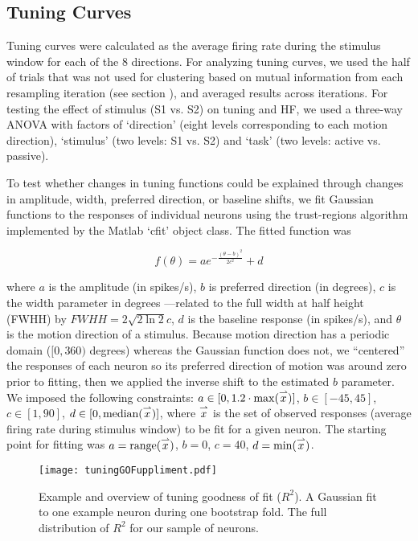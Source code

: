 \subsection*{Tuning Curves}\label{sec:tuning}
Tuning curves were calculated as the average firing rate during the stimulus window for each of the 8 directions. 
For analyzing tuning curves, we used the half of trials that was not used for clustering based on mutual information from each resampling iteration (see section \emph{}), and averaged results across iterations.\label{rev:xval2}
For testing the effect of stimulus (S1 vs. S2) on tuning and HF, we used a three-way ANOVA with factors of `direction' (eight levels corresponding to each motion direction), `stimulus' (two levels: S1 vs. S2) and `task' (two levels: active vs. passive).

To test whether changes in tuning functions could be explained through changes in amplitude, width, preferred direction, or baseline shifts, we fit Gaussian functions to the responses of individual neurons using the trust-regions algorithm implemented by the Matlab `cfit' object class.
The fitted function was

\begin{equation}
	f(\theta) = a e^{-\frac{(\theta-b)^2}{2c^2}} + d
\end{equation}

\noindent where $a$ is the amplitude (in spikes/s), $b$ is preferred direction (in degrees), $c$ is the width parameter in degrees ---related to the full width at half height (FWHH) by $FWHH = 2 \sqrt{2 \ln 2}c$, $d$ is the baseline response (in spikes/s), and $\theta$ is the motion direction of a stimulus.  
Because motion direction has a periodic domain ($[0, 360)$ degrees) whereas the Gaussian function does not, we ``centered'' the responses of each neuron so its preferred direction of motion was around zero prior to fitting, then we applied the inverse shift to the estimated $b$ parameter.
We imposed the following constraints: $a \in [0, 1.2 \cdot \max (\overset{\rightharpoonup} x)]$, $b \in [-45, 45]$, $c \in [1, 90]$, $d \in [0, \textrm{median}(\overset{\rightharpoonup} x)]$, where $\overset{\rightharpoonup} x$ is the set of observed responses (average firing rate during stimulus window) to be fit for a given neuron.
The starting point for fitting was $a = \textrm{range}(\overset{\rightharpoonup} x)$, $b = 0$, $c = 40$, $d = \textrm{min}(\overset{\rightharpoonup} x)$.


	\begin{figure}
		\centering
		\texttt{[image: tuningGOFuppliment.pdf]}
		\caption{Example and overview of tuning goodness of fit ($R^2$). A Gaussian fit to one example neuron during one bootstrap fold. The full distribution of $R^2$ for our sample of neurons.}
		\label{fig:suppFit} %
	\end{figure}



